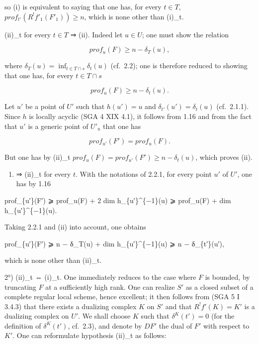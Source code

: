 \documentclass[
  11pt,
  a4paper,
]{book}
\newenvironment{Shaded}{}{}
\newcommand{\NormalTok}[1]{#1}
\newcounter{none} %
\providecommand{\tightlist}{%
  \setlength{\itemsep}{0pt}\setlength{\parskip}{0pt}}
\begin{document}
so (i) is equivalent to saying that one has, for every \(t \in T\),
\(prof_{t'}(R^{!} f'_{1}(F'_{1})) \geqslant n\), which is none other
than (i)\_t.

(ii)\_t for every \(t \in T\) ⇒ (ii). Indeed let \(u \in U\); one must
show the relation

\[ prof_{u}(F) \geqslant n - \delta_{T}(u), \]

where \(\delta_{T}(u) = \inf_{t \in T \cap {s}} \delta_{t}(u)\)
(cf.~2.2); one is therefore reduced to showing that one has, for every
\(t \in T \cap {s}\)

\[ prof_{u}(F) \geqslant n - \delta_{t}(u). \]

Let \(u'\) be a point of \(U'\) such that \(h(u') = u\) and
\(\delta_{t'}(u') = \delta_{t}(u)\) (cf.~2.1.1). Since \(h\) is locally
acyclic (SGA 4 XIX 4.1), it follows from 1.16 and from the fact that
\(u'\) is a generic point of \(U'_{u}\) that one has

\[ prof_{u'}(F') = prof_{u}(F). \]

But one has by (ii)\_t
\(prof_{u}(F) = prof_{u'}(F') \geqslant n - \delta_{t}(u)\), which
proves (ii).

\begin{enumerate}
\def\labelenumi{(\roman{enumi})}
\setcounter{enumi}{1}
\tightlist
\item
  ⇒ (ii)\_t for every \(t\). With the notations of 2.2.1, for every
  point \(u'\) of \(U'\), one has by 1.16
\end{enumerate}

\begin{Shaded}
\begin{Highlighting}[]
\NormalTok{prof\_\{u′\}(F′) ⩾ prof\_u(F) + 2 dim h\_\{u′\}\^{}\{−1\}(u) ⩾ prof\_u(F) + dim h\_\{u′\}\^{}\{−1\}(u).}
\end{Highlighting}
\end{Shaded}

Taking 2.2.1 and (ii) into account, one obtains

\begin{Shaded}
\begin{Highlighting}[]
\NormalTok{prof\_\{u′\}(F′) ⩾ n − δ\_T(u) + dim h\_\{u′\}\^{}\{−1\}(u) ⩾ n − δ\_\{t′\}(u′),}
\end{Highlighting}
\end{Shaded}

which is none other than (ii)\_t.

2°) (ii)\_t ⇔ (i)\_t. One immediately reduces to the case where \(F\) is
bounded, by truncating \(F\) at a sufficiently high rank. One can
realize \(S'\) as a closed subset of a complete regular local scheme,
hence excellent; it then follows from (SGA 5 I 3.4.3) that there exists
a dualizing complex \(K\) on \(S'\) and that \(R^{!} f'(K) = K'\) is a
dualizing complex on \(U'\). We shall choose \(K\) such that
\(\delta^{K}(t') = 0\) (for the definition of \(\delta^{K}(t')\),
cf.~2.3), and denote by \(DF'\) the dual of \(F'\) with respect to
\(K'\). One can reformulate hypothesis (ii)\_t as follows:
\end{document}
